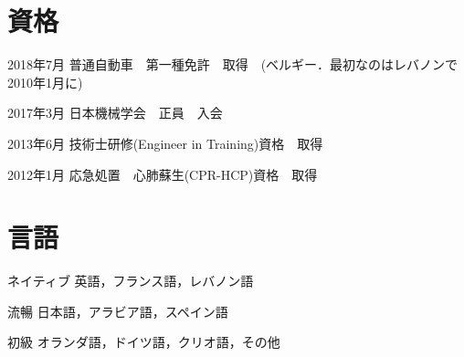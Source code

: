 \documentclass[10pt, a4paper]{article}
\begin{document}
\section{資格}
\begin{lonelist}
\item[2018年7月] 普通自動車　第一種免許　取得　(ベルギー．最初なのはレバノンで2010年1月に)
\item[2017年3月] 日本機械学会　正員　入会
\item[2013年6月] 技術士研修(Engineer in Training)資格　取得
\item[2012年1月] 応急処置　心肺蘇生(CPR-HCP)資格　取得
\end{lonelist}

\section{言語}
\begin{lonelist}
\item[ネイティブ] 英語，フランス語，レバノン語
\item[流暢] 日本語，アラビア語，スペイン語
\item[初級] オランダ語，ドイツ語，クリオ語，その他
\end{lonelist}

\end{document}
